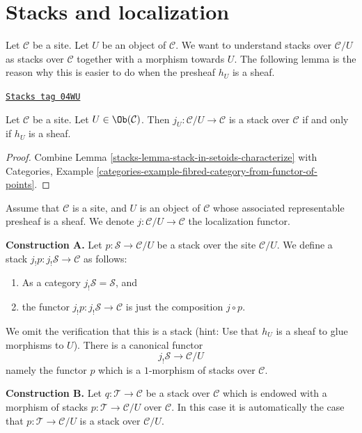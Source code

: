 \section{Stacks and localization}
\label{stacks-section-localize}
Let $\mathcal{C}$ be a site.
Let $U$ be an object of $\mathcal{C}$.
We want to understand stacks over $\mathcal{C}/U$ as stacks
over $\mathcal{C}$ together with a morphism towards $U$.
The following lemma is the reason why this is easier to do
when the presheaf $h_U$ is a sheaf.

\begin{lemma}
\label{stacks-lemma-when-localization-stack}
\href{https://stacks.math.columbia.edu/tag/04WU}{\texttt{Stacks tag 04WU}}

Let $\mathcal{C}$ be a site. Let $U \in \Ob(\mathcal{C})$.
Then $j_U : \mathcal{C}/U \to \mathcal{C}$ is a stack over $\mathcal{C}$
if and only if $h_U$ is a sheaf.
\end{lemma}

\begin{proof}

Combine
Lemma \ref{stacks-lemma-stack-in-setoids-characterize}
with
Categories,
Example \ref{categories-example-fibred-category-from-functor-of-points}.
\end{proof}

Assume that $\mathcal{C}$ is a site,
and $U$ is an object of $\mathcal{C}$ whose associated representable
presheaf is a sheaf. We denote $j : \mathcal{C}/U \to \mathcal{C}$
the localization functor.

\medskip\noindent
{\bf Construction A.} Let $p : \mathcal{S} \to \mathcal{C}/U$ be a stack
over the site $\mathcal{C}/U$. We define a stack
$j_!p : j_!\mathcal{S} \to \mathcal{C}$ as follows:
\begin{enumerate}
\item As a category $j_!\mathcal{S} = \mathcal{S}$, and
\item the functor $j_!p : j_!\mathcal{S} \to \mathcal{C}$
is just the composition $j \circ p$.
\end{enumerate}
We omit the verification that this is a stack (hint: Use that
$h_U$ is a sheaf to glue morphisms to $U$). There is a canonical
functor
$$
j_!\mathcal{S} \longrightarrow \mathcal{C}/U
$$
namely the functor $p$ which is a $1$-morphism of stacks over $\mathcal{C}$.

\medskip\noindent
{\bf Construction B.}
Let $q : \mathcal{T} \to \mathcal{C}$ be a stack over $\mathcal{C}$
which is endowed with a morphism of stacks $p : \mathcal{T} \to \mathcal{C}/U$
over $\mathcal{C}$. In this case it is automatically the case that
$p : \mathcal{T} \to \mathcal{C}/U$ is a stack over $\mathcal{C}/U$.

